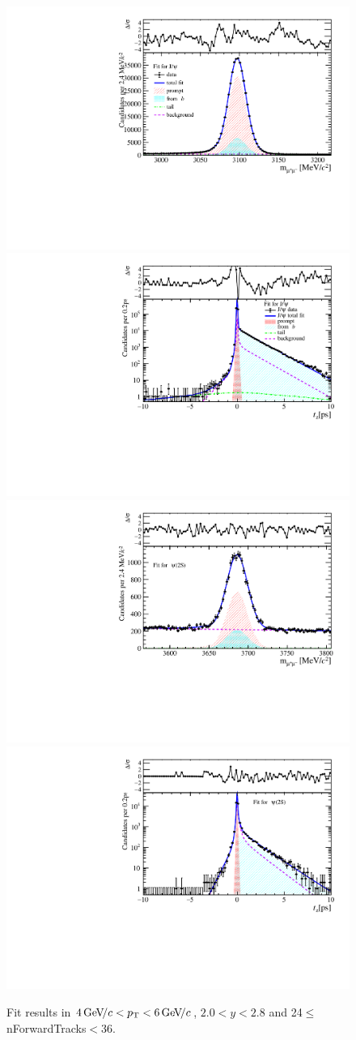\begin{figure}[H]
\begin{center}
\includegraphics[width=0.47\linewidth]{pdf/Jpsi/drawmassF/n3y1pt3.pdf}
\includegraphics[width=0.47\linewidth]{pdf/Jpsi/2DFitF/n3y1pt3.pdf}
\vspace*{-0.5cm}
\includegraphics[width=0.47\linewidth]{pdf/Psi2S/drawmassF/n3y1pt3.pdf}
\includegraphics[width=0.47\linewidth]{pdf/Psi2S/2DFitF/n3y1pt3.pdf}
\vspace*{-0.5cm}
\end{center}
\caption{Fit results in $4\text{\,Ge\kern -0.1em V\!/}c<p_{\mathrm{T}}<6\text{\,Ge\kern -0.1em V\!/}c$, $2.0<y<2.8$ and 24$\leq$nForwardTracks$<$36.}
\label{Fitn3y1pt3}
\end{figure}
